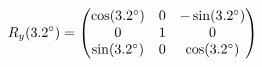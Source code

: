 \documentclass[preview]{standalone}
\begin{document}
\begin{align*}
\special{dvisvgm:raw <g id='unique000'>}R_y(3.2^\circ) = \begin{pmatrix} \cos(3.2^\circ) & 0 & -\sin(3.2^\circ) \\ 0 & 1 & 0 \\ \sin(3.2^\circ) & 0 & \cos(3.2^\circ) \end{pmatrix}\special{dvisvgm:raw </g>}
\end{align*}
\end{document}
